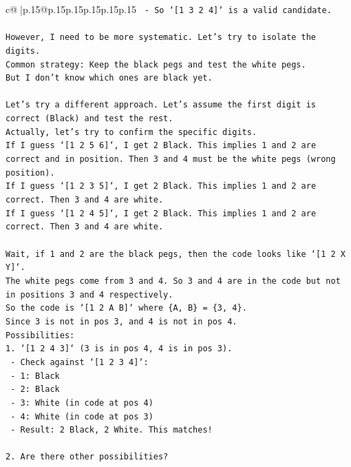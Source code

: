 \documentclass{article}
\begin{document}
{\begin{supertabular}{c@{$\;$}|p{.15\linewidth}@{}p{.15\linewidth}p{.15\linewidth}p{.15\linewidth}p{.15\linewidth}p{.15\linewidth}}
{{{\texttt{  {-} So `{[}1 3 2 4{]}` is a valid candidate.} \\
\\ 
\texttt{However, I need to be more systematic. Let's try to isolate the digits.} \\
\texttt{Common strategy: Keep the black pegs and test the white pegs.} \\
\texttt{But I don't know which ones are black yet.} \\
\\ 
\texttt{Let's try a different approach. Let's assume the first digit is correct (Black) and test the rest.} \\
\texttt{Actually, let's try to confirm the specific digits.} \\
\texttt{If I guess `{[}1 2 5 6{]}`, I get 2 Black. This implies 1 and 2 are correct and in position. Then 3 and 4 must be the white pegs (wrong position).} \\
\texttt{If I guess `{[}1 2 3 5{]}`, I get 2 Black. This implies 1 and 2 are correct. Then 3 and 4 are white.} \\
\texttt{If I guess `{[}1 2 4 5{]}`, I get 2 Black. This implies 1 and 2 are correct. Then 3 and 4 are white.} \\
\\ 
\texttt{Wait, if 1 and 2 are the black pegs, then the code looks like `{[}1 2 X Y{]}`.} \\
\texttt{The white pegs come from 3 and 4. So 3 and 4 are in the code but not in positions 3 and 4 respectively.} \\
\texttt{So the code is `{[}1 2 A B{]}` where \{A, B\} = \{3, 4\}.} \\
\texttt{Since 3 is not in pos 3, and 4 is not in pos 4.} \\
\texttt{Possibilities:} \\
\texttt{1. `{[}1 2 4 3{]}` (3 is in pos 4, 4 is in pos 3).} \\
\texttt{   {-} Check against `{[}1 2 3 4{]}`:} \\
\texttt{     {-} 1: Black} \\
\texttt{     {-} 2: Black} \\
\texttt{     {-} 3: White (in code at pos 4)} \\
\texttt{     {-} 4: White (in code at pos 3)} \\
\texttt{   {-} Result: 2 Black, 2 White. This matches!} \\
\\ 
\texttt{2. Are there other possibilities?} \\
}}}
\end{supertabular}}
\end{document}
